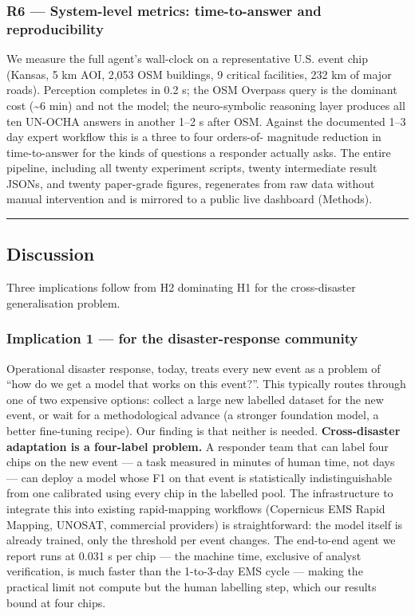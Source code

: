 \subsubsection{R6 --- System-level metrics: time-to-answer and reproducibility}\label{r6-system-level-metrics-time-to-answer-and-reproducibility}

We measure the full agent's wall-clock on a representative U.S. event chip
(Kansas, 5 km AOI, 2,053 OSM buildings, 9 critical facilities, 232 km of
major roads). Perception completes in 0.2 s; the OSM Overpass query is the
dominant cost (\textasciitilde6 min) and not the model; the neuro-symbolic reasoning layer
produces all ten UN-OCHA answers in another 1--2 s after OSM. Against the
documented 1--3 day expert workflow this is a three to four orders-of-
magnitude reduction in time-to-answer for the kinds of questions a responder
actually asks. The entire pipeline, including all twenty experiment scripts,
twenty intermediate result JSONs, and twenty paper-grade figures, regenerates
from raw data without manual intervention and is mirrored to a public live
dashboard (Methods).

\begin{center}\rule{0.5\linewidth}{0.5pt}\end{center}

\subsection{Discussion}\label{discussion}

Three implications follow from H2 dominating H1 for the cross-disaster
generalisation problem.

\subsubsection{Implication 1 --- for the disaster-response community}\label{implication-1-for-the-disaster-response-community}

Operational disaster response, today, treats every new event as a
problem of ``how do we get a model that works on this event?''. This
typically routes through one of two expensive options: collect a large
new labelled dataset for the new event, or wait for a methodological
advance (a stronger foundation model, a better fine-tuning recipe). Our
finding is that neither is needed. \textbf{Cross-disaster adaptation is a
four-label problem.} A responder team that can label four chips on the
new event --- a task measured in minutes of human time, not days --- can
deploy a model whose F1 on that event is statistically indistinguishable
from one calibrated using every chip in the labelled pool. The
infrastructure to integrate this into existing rapid-mapping workflows
(Copernicus EMS Rapid Mapping, UNOSAT, commercial providers) is
straightforward: the model itself is already trained, only the
threshold per event changes. The end-to-end agent we report runs at
0.031 s per chip --- the machine time, exclusive of analyst verification, is much faster than the 1-to-3-day
EMS cycle --- making the practical limit not compute but the human
labelling step, which our results bound at four chips.

